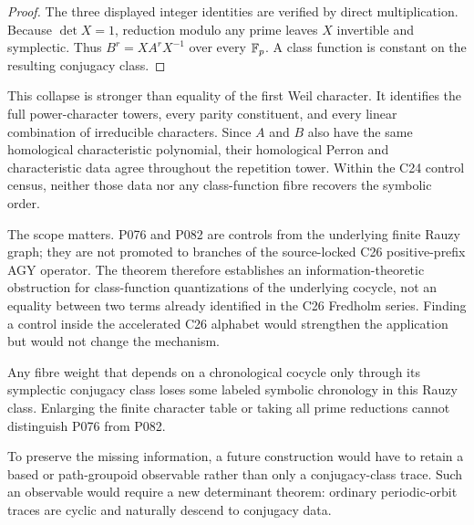 \begin{proof}
The three displayed integer identities are verified by direct multiplication.
Because \(\det X=1\), reduction modulo any prime leaves \(X\) invertible and
symplectic.  Thus \(B^r=XA^rX^{-1}\) over every \(\mathbb{F}_p\).  A class function
is constant on the resulting conjugacy class.
\end{proof}

This collapse is stronger than equality of the first Weil character.  It
identifies the full power-character towers, every parity constituent, and
every linear combination of irreducible characters.  Since \(A\) and \(B\)
also have the same homological characteristic polynomial, their homological
Perron and characteristic data agree throughout the repetition tower.
Within the C24 control census, neither those data nor any class-function
fibre recovers the symbolic order.

The scope matters.  P076 and P082 are controls from the underlying finite
Rauzy graph; they are not promoted to branches of the source-locked C26
positive-prefix AGY operator.  The theorem therefore establishes an
information-theoretic obstruction for class-function quantizations of the
underlying cocycle, not an equality between two terms already identified in
the C26 Fredholm series.  Finding a control inside the accelerated C26
alphabet would strengthen the application but would not change the mechanism.

\begin{obstruction}
Any fibre weight that depends on a chronological cocycle only through its
symplectic conjugacy class loses some labeled symbolic chronology in this
Rauzy class.  Enlarging the finite character table or taking all prime
reductions cannot distinguish P076 from P082.
\end{obstruction}

To preserve the missing information, a future construction would have to
retain a based or path-groupoid observable rather than only a conjugacy-class
trace.  Such an observable would require a new determinant theorem: ordinary
periodic-orbit traces are cyclic and naturally descend to conjugacy data.
